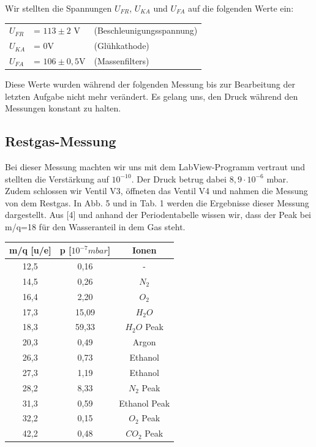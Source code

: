 Wir stellten die Spannungen $U_{FR}$, $U_{KA}$ und $U_{FA}$ auf die folgenden Werte ein:

\begin{tabular}{l l l}
$U_{FR}$ & = $113\pm 2$ V & (Beschleunigungsspannung)\\
$U_{KA}$ & = 0V & (Glühkathode)\\
$U_{FA}$ & = $106\pm 0,5$V & (Massenfilters)\\
\end{tabular}

Diese Werte wurden während der folgenden Messung bis zur Bearbeitung der letzten Aufgabe nicht mehr verändert. 
Es gelang uns, den Druck während den Messungen konstant zu halten.

\subsection{Restgas-Messung}
Bei dieser Messung machten wir uns mit dem LabView-Programm vertraut und stellten die Verstärkung auf $10^{-10}$. Der Druck betrug dabei $8,9 \cdot 10^{-6}$ mbar. Zudem schlossen wir Ventil V3, öffneten das Ventil V4 und nahmen die Messung von dem Restgas. In Abb. 5 und in Tab. 1 werden die Ergebnisse dieser Messung dargestellt. Aus [4] und anhand der Periodentabelle wissen wir, dass der Peak bei m/q=18 für den Wasseranteil in dem Gas steht.


\begin{center}
\begin{tabular}{c|c|c}
m/q [u/e] & p [$10^{-7} mbar$] & Ionen\\	
\hline	
12,5 &	0,16 & - \\
14,5 &	0,26 & $N_2$\\
16,4 &	2,20 & $O_2$\\
17,3 &	15,09 & $H_2O$\\
18,3 &	59,33 & $H_2O$ Peak\\
20,3 &	0,49 & Argon\\
26,3 &	0,73 & Ethanol\\
27,3 &	1,19 & Ethanol\\
28,2 &	8,33 & $N_2$ Peak\\
31,3 &	0,59 & Ethanol Peak\\
32,2 &	0,15 & $O_2$ Peak\\
42,2 &	0,48 & $CO_2$ Peak\\
\end{tabular}
\end{center}

